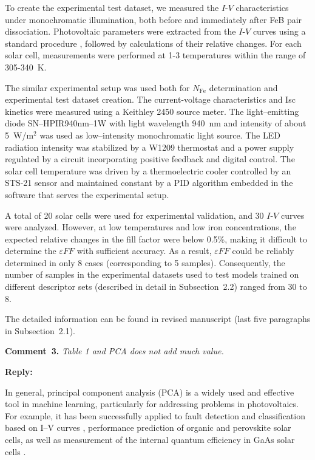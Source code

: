 \documentclass[a4paper,fleqn]{cas-sc}
\begin{document}
To create the experimental test dataset, we measured the $I$-$V$ characteristics under monochromatic illumination, 
both before and immediately after FeB pair dissociation. 
Photovoltaic parameters were extracted from the $I$-$V$ curves using a standard procedure \cite{SCparam2017}, 
followed by calculations of their relative changes. 
For each solar cell, measurements were performed at 1-3 temperatures within the range of 305-340~K.

The similar experimental setup was used both for $N_\mathrm{Fe}$ determination and experimental test dataset creation.
The current-voltage characteristics and Isc kinetics were measured using a Keithley 2450 source meter.
The light--emitting diode SN--HPIR940nm--1W with light wavelength 940~nm and intensity of about 5~W/m$^{2}$ was used as low--intensity monochromatic light source. 
The LED radiation intensity was stabilized by a W1209 thermostat and a power supply regulated by a circuit incorporating positive feedback and digital control.
The solar cell temperature was driven by a thermoelectric cooler controlled by an STS-21 sensor
and maintained constant by a PID algorithm embedded in the software that serves the experimental setup.

A total of 20 solar cells were used for experimental validation, and 30 $I$-$V$ curves were analyzed. 
However, at low temperatures and low iron concentrations, 
the expected relative changes in the fill factor were below 0.5\%, 
making it difficult to determine the $\varepsilon F\!F$ with sufficient accuracy. 
As a result, $\varepsilon F\!F$ could be reliably determined in only 8 cases (corresponding to 5 samples). 
Consequently, the number of samples in the experimental datasets used to test models trained on different descriptor sets 
(described in detail in Subsection~2.2) ranged from 30 to 8.

The detailed information can be found in revised manuscript (last five paragraphs in Subsection~2.1).



\vspace{1cm}
\noindent
\textcolor[rgb]{0.00,0.50,1.00}{\textbf{Comment~3.}}
\emph{Table 1 and PCA does not add much value.}

\noindent
\textcolor[rgb]{0.51,0.00,0.00}{\textbf{Reply:}}

In general, principal component analysis (PCA) is a widely used and effective tool in machine learning,
particularly for addressing problems in photovoltaics.
For example, it has been successfully applied to fault detection and classification based on I–V curves \cite{Fadhel2019, Gao2020},
performance prediction of organic \cite{David2021} and perovskite \cite{Liu2022} solar cells,
as well as measurement of the internal quantum efficiency in GaAs solar cells \cite{AbdullahVetter2025}.
\end{document}
